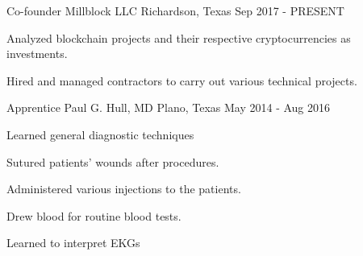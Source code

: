 \begin{cventries}
	\cventry
	{Co-founder} %
	{Millblock LLC} %
	{Richardson, Texas} %
	{Sep 2017 - PRESENT} %
	{
		\begin{cvitems} %
			\item {Analyzed blockchain projects and their respective cryptocurrencies as investments.}
			\item {Hired and managed contractors to carry out various technical projects.}
		\end{cvitems}
	}

	\cventry
	{Apprentice} %
	{Paul G. Hull, MD} %
	{Plano, Texas} %
	{May 2014 - Aug 2016} %
	{
		\begin{cvitems} %
			\item {Learned general diagnostic techniques}
			\item {Sutured patients' wounds after procedures.}
			\item {Administered various injections to the patients.}
			\item {Drew blood for routine blood tests.}
			\item {Learned to interpret EKGs}
		\end{cvitems}
	}

\end{cventries}
